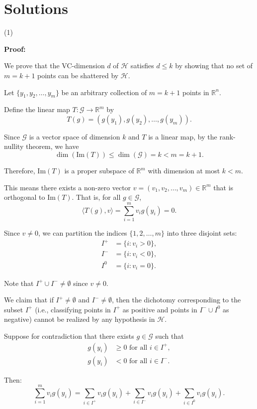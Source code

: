 \documentclass[letterpaper, 11pt]{article}
\newcommand{\1}{\mathds{1}}	%
\theoremstyle{definition}
\begin{document}
\section*{Solutions}

(1)

\textbf{Proof:}

We prove that the VC-dimension $d$ of $\mathcal{H}$ satisfies $d \leq k$ by showing that no set of $m = k + 1$ points can be shattered by $\mathcal{H}$.

Let $\{y_1, y_2, \ldots, y_m\}$ be an arbitrary collection of $m = k + 1$ points in $\mathbb{R}^n$.

Define the linear map $T: \mathcal{G} \to \mathbb{R}^m$ by
\[
T(g) = (g(y_1), g(y_2), \ldots, g(y_m)).
\]

Since $\mathcal{G}$ is a vector space of dimension $k$ and $T$ is a linear map, by the rank-nullity theorem, we have
\[
\dim(\text{Im}(T)) \leq \dim(\mathcal{G}) = k < m = k + 1.
\]

Therefore, $\text{Im}(T)$ is a proper subspace of $\mathbb{R}^m$ with dimension at most $k < m$.

This means there exists a non-zero vector $v = (v_1, v_2, \ldots, v_m) \in \mathbb{R}^m$ that is orthogonal to $\text{Im}(T)$. That is, for all $g \in \mathcal{G}$,
\[
\langle T(g), v \rangle = \sum_{i=1}^m v_i g(y_i) = 0.
\]

Since $v \neq 0$, we can partition the indices $\{1, 2, \ldots, m\}$ into three disjoint sets:
\begin{align*}
I^+ &= \{i : v_i > 0\}, \\
I^- &= \{i : v_i < 0\}, \\
I^0 &= \{i : v_i = 0\}.
\end{align*}

Note that $I^+ \cup I^- \neq \emptyset$ since $v \neq 0$.

We claim that if $I^+ \neq \emptyset$ and $I^- \neq \emptyset$, then the dichotomy corresponding to the subset $I^+$ (i.e., classifying points in $I^+$ as positive and points in $I^- \cup I^0$ as negative) cannot be realized by any hypothesis in $\mathcal{H}$.

Suppose for contradiction that there exists $g \in \mathcal{G}$ such that 
\begin{align*}
g(y_i) &\geq 0 \text{ for all } i \in I^+, \\
g(y_i) &< 0 \text{ for all } i \in I^-.
\end{align*}

Then:
\[
\sum_{i=1}^m v_i g(y_i) = \sum_{i \in I^+} v_i g(y_i) + \sum_{i \in I^-} v_i g(y_i) + \sum_{i \in I^0} v_i g(y_i).
\]
\end{document}
